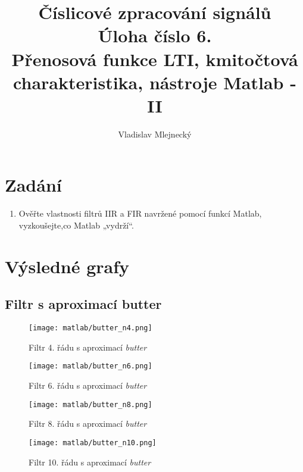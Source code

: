 \documentclass[11pt, a4paper]{article}
\author{Vladislav Mlejnecký}
\title{%
  Číslicové zpracování signálů\\
  \large Úloha číslo 6.\\
  Přenosová funkce LTI, kmitočtová charakteristika, nástroje Matlab - II}
\begin{document}
    \maketitle

    \section{Zadání}
    
        \begin{enumerate}
            \item
            Ověřte vlastnosti filtrů IIR a FIR navržené pomocí funkcí Matlab, vyzkoušejte,co Matlab „vydrží“.
        \end{enumerate}
    
    \section{Výsledné grafy}
    
        \subsection{Filtr s aproximací butter}
            
            \begin{figure}[H]
                \centering
                \begin{minipage}{.5\textwidth}
                    \centering
                    \texttt{[image: matlab/butter\_n4.png]}
                    \caption{Filtr 4. řádu s aproximací \textit{butter}}
                    \label{fig:1}
                \end{minipage}%
                \begin{minipage}{.5\textwidth}
                    \centering
                    \texttt{[image: matlab/butter\_n6.png]}
                    \caption{Filtr 6. řádu s aproximací \textit{butter}}
                    \label{fig:2}
                \end{minipage}
            \end{figure}
        
            \begin{figure}[H]
                \centering
                \begin{minipage}{.5\textwidth}
                    \centering
                    \texttt{[image: matlab/butter\_n8.png]}
                    \caption{Filtr 8. řádu s aproximací \textit{butter}}
                    \label{fig:3}
                \end{minipage}%
                \begin{minipage}{.5\textwidth}
                    \centering
                    \texttt{[image: matlab/butter\_n10.png]}
                    \caption{Filtr 10. řádu s aproximací \textit{butter}}
                    \label{fig:4}
                \end{minipage}
            \end{figure}
            
\end{document}
